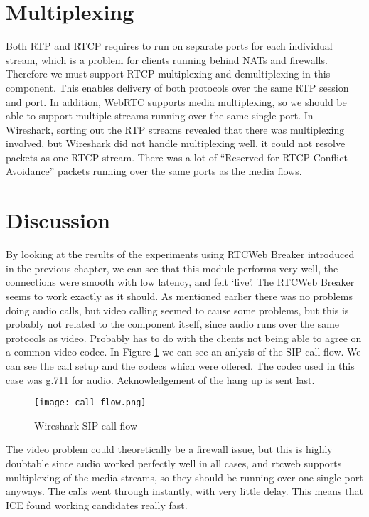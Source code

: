 \section{Multiplexing}
Both RTP and RTCP requires to run on separate ports for each individual stream, which is a problem for clients running behind NATs and firewalls. Therefore we must support RTCP multiplexing and demultiplexing in this component. This enables delivery of both protocols over the same RTP session and port. In addition, WebRTC supports media multiplexing, so we should be able to support multiple streams running over the same single port. In Wireshark, sorting out the RTP streams revealed that there was multiplexing involved, but Wireshark did not handle multiplexing well, it could not resolve packets as one RTCP stream. There was a lot of ``Reserved for RTCP Conflict Avoidance'' packets running over the same ports as the media flows.

\section{Discussion}
By looking at the results of the experiments using RTCWeb Breaker introduced in the previous chapter, we can see that this module performs very well, the connections were smooth with low latency, and felt `live'. The RTCWeb Breaker seems to work exactly as it should. As mentioned earlier there was no problems doing audio calls, but video calling seemed to cause some problems, but this is probably not related to the component itself, since audio runs over the same protocols as video. Probably has to do with the clients not being able to agree on a common video codec. In Figure \ref{fig:wireshark-sip-call-flow} we can see an anlysis of the SIP call flow. We can see the call setup and the codecs which were offered. The codec used in this case was g.711 for audio. Acknowledgement of the hang up is sent last.

\begin{figure}[here]
\centerline{\texttt{[image: call-flow.png]}}
\caption{Wireshark SIP call flow}
\label{fig:wireshark-sip-call-flow}
\end{figure}

The video problem could theoretically be a firewall issue, but this is highly doubtable since audio worked perfectly well in all cases, and \gls{rtcweb} supports multiplexing of the media streams, so they should be running over one single port anyways. The calls went through instantly, with very little delay. This means that ICE found working candidates really fast.

